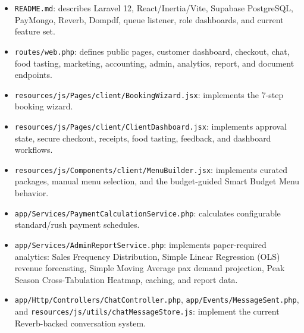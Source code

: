 \documentclass[11pt]{article}
\begin{document}
\begin{itemize}
    \item \texttt{README.md}: describes Laravel 12, React/Inertia/Vite, Supabase PostgreSQL, PayMongo, Reverb, Dompdf, queue listener, role dashboards, and current feature set.
    \item \texttt{routes/web.php}: defines public pages, customer dashboard, checkout, chat, food tasting, marketing, accounting, admin, analytics, report, and document endpoints.
    \item \texttt{resources/js/Pages/client/BookingWizard.jsx}: implements the 7-step booking wizard.
    \item \texttt{resources/js/Pages/client/ClientDashboard.jsx}: implements approval state, secure checkout, receipts, food tasting, feedback, and dashboard workflows.
    \item \texttt{resources/js/Components/client/MenuBuilder.jsx}: implements curated packages, manual menu selection, and the budget-guided Smart Budget Menu behavior.
    \item \texttt{app/Services/PaymentCalculationService.php}: calculates configurable standard/rush payment schedules.
    \item \texttt{app/Services/AdminReportService.php}: implements paper-required analytics: Sales Frequency Distribution, Simple Linear Regression (OLS) revenue forecasting, Simple Moving Average pax demand projection, Peak Season Cross-Tabulation Heatmap, caching, and report data.
    \item \texttt{app/Http/Controllers/ChatController.php}, \texttt{app/Events/MessageSent.php}, and \texttt{resources/js/utils/chatMessageStore.js}: implement the current Reverb-backed conversation system.
\end{itemize}
\end{document}
